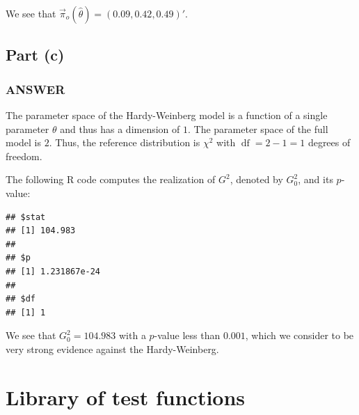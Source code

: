 \documentclass[
]{article}
\newenvironment{Shaded}{\begin{snugshade}}{\end{snugshade}}
\newcommand{\AttributeTok}[1]{\textcolor[rgb]{0.13,0.29,0.53}{#1}}
\newcommand{\DecValTok}[1]{\textcolor[rgb]{0.00,0.00,0.81}{#1}}
\newcommand{\FunctionTok}[1]{\textcolor[rgb]{0.13,0.29,0.53}{\textbf{#1}}}
\newcommand{\NormalTok}[1]{#1}
\newcommand{\OtherTok}[1]{\textcolor[rgb]{0.56,0.35,0.01}{#1}}
\newcommand{\SpecialCharTok}[1]{\textcolor[rgb]{0.81,0.36,0.00}{\textbf{#1}}}
\begin{document}
We see that \(\vec{\pi}_{o}(\hat\theta) = (0.09, 0.42, 0.49)'\).

\hypertarget{part-c-3}{%
\subsection{Part (c)}\label{part-c-3}}


\hypertarget{answer-19}{%
\subsubsection{ANSWER}\label{answer-19}}

The parameter space of the Hardy-Weinberg model is a function of a
single parameter \(\theta\) and thus has a dimension of \(1\). The
parameter space of the full model is \(2\). Thus, the reference
distribution is \(\chi^2\) with \(\operatorname{df} = 2 - 1 = 1\)
degrees of freedom.

The following R code computes the realization of \(G^2\), denoted by
\(G_0^2\), and its \(p\)-value:

\begin{Shaded}
\end{Shaded}

\begin{verbatim}
## $stat
## [1] 104.983
## 
## $p
## [1] 1.231867e-24
## 
## $df
## [1] 1
\end{verbatim}

We see that \(G_0^2 = 104.983\) with a \(p\)-value less than \(0.001\),
which we consider to be very strong evidence against the Hardy-Weinberg.

\hypertarget{library-of-test-functions}{%
\section{Library of test functions}\label{library-of-test-functions}}

\inputminted{R}{test_functions.R}
\end{document}
